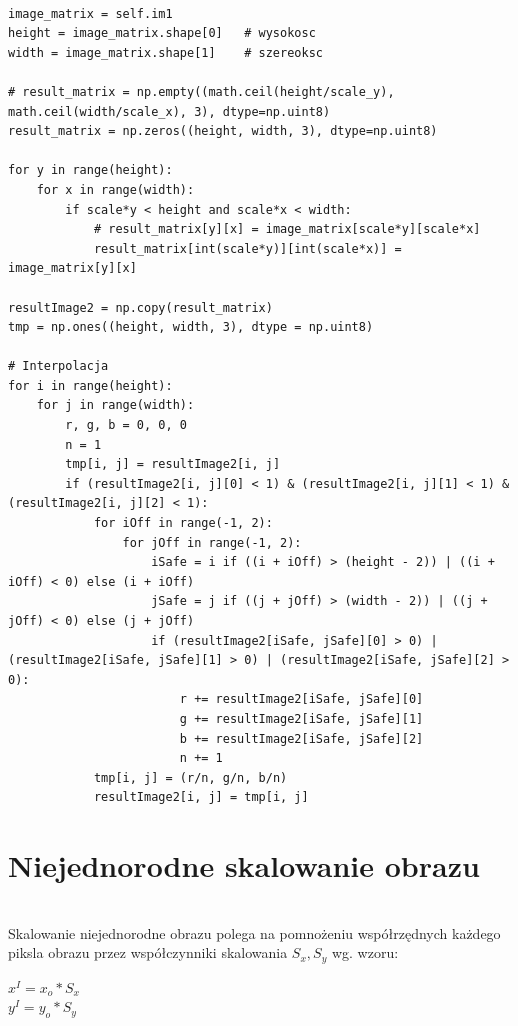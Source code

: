 \documentclass[final,a4paper,openany,12pt]{mwbk}
\begin{document}
\begin{lstlisting}[caption= Jednorodne skalowanie obrazu]

image_matrix = self.im1
height = image_matrix.shape[0]   # wysokosc
width = image_matrix.shape[1]    # szereoksc

# result_matrix = np.empty((math.ceil(height/scale_y), math.ceil(width/scale_x), 3), dtype=np.uint8)
result_matrix = np.zeros((height, width, 3), dtype=np.uint8)

for y in range(height):
    for x in range(width): 
        if scale*y < height and scale*x < width:
            # result_matrix[y][x] = image_matrix[scale*y][scale*x]
            result_matrix[int(scale*y)][int(scale*x)] = image_matrix[y][x]

resultImage2 = np.copy(result_matrix)
tmp = np.ones((height, width, 3), dtype = np.uint8)

# Interpolacja
for i in range(height):
    for j in range(width):
        r, g, b = 0, 0, 0
        n = 1
        tmp[i, j] = resultImage2[i, j]
        if (resultImage2[i, j][0] < 1) & (resultImage2[i, j][1] < 1) & (resultImage2[i, j][2] < 1):
            for iOff in range(-1, 2):
                for jOff in range(-1, 2):
                    iSafe = i if ((i + iOff) > (height - 2)) | ((i + iOff) < 0) else (i + iOff)
                    jSafe = j if ((j + jOff) > (width - 2)) | ((j + jOff) < 0) else (j + jOff)
                    if (resultImage2[iSafe, jSafe][0] > 0) | (resultImage2[iSafe, jSafe][1] > 0) | (resultImage2[iSafe, jSafe][2] > 0):
                        r += resultImage2[iSafe, jSafe][0]
                        g += resultImage2[iSafe, jSafe][1]
                        b += resultImage2[iSafe, jSafe][2]
                        n += 1
            tmp[i, j] = (r/n, g/n, b/n)
            resultImage2[i, j] = tmp[i, j]

\end{lstlisting}
\newpage

\section{ Niejednorodne skalowanie obrazu}
\hfill\\
\indent
Skalowanie niejednorodne obrazu polega na pomnożeniu współrzędnych każdego piksla obrazu przez współczynniki skalowania $S_{x}, S_{y}$ wg. wzoru:

\begin{center}
	$x^I = x_{o} * S_{x}$ \\
	$y^I = y_{o} * S_{y}$
\end{center}
\end{document}
